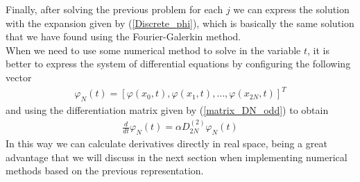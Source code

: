 	Finally, after solving the previous problem for each $j$ we can express the solution with the expansion given by (\ref{Discrete_phi}), which is basically the same solution that we have found using the Fourier-Galerkin method. \\
	
	When we need to use some numerical method to solve in the variable $ t $, it is better to express the system of differential equations by configuring the following vector
	\begin{align*}
		\varphi_N (t) = \left[ \varphi(x_0, t), \varphi(x_1, t), \dots, \varphi(x_{2N}, t) \right]^T
	\end{align*} 
	and using the differentiation matrix given by (\ref{matrix_DN_odd}) to obtain
	\begin{align*}
		\frac{d}{dt} \varphi_N (t) = \alpha D^{(2)}_{2N} \varphi_N (t)
	\end{align*}
	In this way we can calculate derivatives directly in real space, being a great advantage that we will discuss in the next section when implementing numerical methods based on the previous representation.